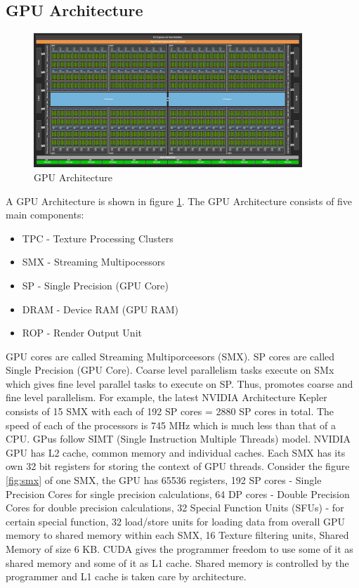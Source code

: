 \documentclass[12pt]{article}
\begin{document}
\subsection{GPU Architecture}
\begin{figure}[H]
    \centering
    \includegraphics[width=0.9\textwidth]{images/gpu.png}
    \caption{GPU Architecture}
    \label{fig:gpu}
\end{figure}
A GPU Architecture is shown in figure \ref{fig:gpu}.
The GPU Architecture consists of five main components:
\begin{itemize}
    \item TPC - Texture Processing Clusters
    \item SMX - Streaming Multipocessors
    \item SP - Single Precision (GPU Core)
    \item DRAM - Device RAM (GPU RAM)
    \item ROP - Render Output Unit
\end{itemize}
GPU cores are called Streaming Multiporceesors (SMX).
SP cores are called Single Precision (GPU Core).
Coarse level parallelism tasks execute on SMx which gives fine level parallel tasks to execute on SP.
Thus, promotes coarse and fine level parallelism. For example, the latest NVIDIA Architecture 
Kepler consists of 15 SMX with each of 192 SP cores = 2880 SP cores in total.
The speed of each of the processors is 745 MHz which is much less than that of a CPU.
GPus follow SIMT (Single Instruction Multiple Threads) model.
NVIDIA GPU has L2 cache, common memory and individual caches. Each SMX has its own 32 bit registers
for storing the context of GPU threads. 
Consider the figure \ref{fig:smx} of one SMX, 
the GPU has 65536 registers, 192 SP cores - Single Precision Cores for single precision calculations,
64 DP cores - Double Precision Cores for double precision calculations, 32 Special Function Units (SFUs) -
for certain special function, 32 load/store units for loading data from overall GPU memory to shared memory within 
each SMX, 16 Texture filtering units, Shared Memory of size 6 KB. CUDA gives the programmer freedom to use some of it as shared memory
and some of it as L1 cache. Shared memory is controlled by the programmer and L1 cache is taken care by architecture.
\end{document}

